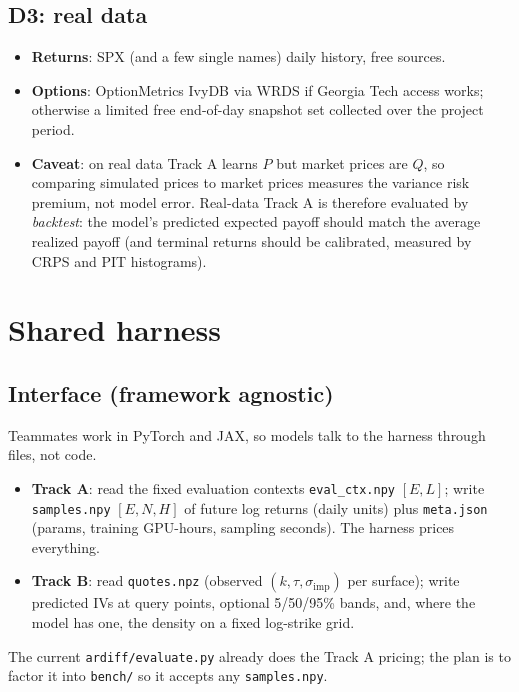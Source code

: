 \documentclass[10pt]{article}
\begin{document}
\subsection{D3: real data}
\begin{itemize}
\item \textbf{Returns}: SPX (and a few single names) daily history, free sources.
\item \textbf{Options}: OptionMetrics IvyDB via WRDS if Georgia Tech access works; otherwise a limited free
end-of-day snapshot set collected over the project period.
\item \textbf{Caveat}: on real data Track A learns $P$ but market prices are $Q$, so comparing simulated prices to
market prices measures the variance risk premium, not model error. Real-data Track A is therefore evaluated by
\emph{backtest}: the model's predicted expected payoff should match the average realized payoff (and terminal
returns should be calibrated, measured by CRPS and PIT histograms).
\end{itemize}

\section{Shared harness}

\subsection{Interface (framework agnostic)}
Teammates work in PyTorch and JAX, so models talk to the harness through files, not code.
\begin{itemize}
\item \textbf{Track A}: read the fixed evaluation contexts \texttt{eval\_ctx.npy} $[E,L]$; write
\texttt{samples.npy} $[E,N,H]$ of future log returns (daily units) plus \texttt{meta.json}
(params, training GPU-hours, sampling seconds). The harness prices everything.
\item \textbf{Track B}: read \texttt{quotes.npz} (observed $(k,\tau,\sigma_{\text{imp}})$ per surface); write
predicted IVs at query points, optional 5/50/95\% bands, and, where the model has one, the density on a fixed
log-strike grid.
\end{itemize}
The current \texttt{ardiff/evaluate.py} already does the Track A pricing; the plan is to factor it into
\texttt{bench/} so it accepts any \texttt{samples.npy}.
\end{document}
